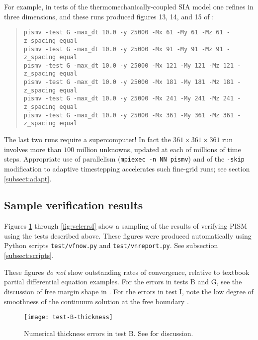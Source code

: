 For example, in tests of the thermomechanically-coupled SIA model one refines in three dimensions, and these runs produced figures 13, 14, and 15 of \cite{BBL}:
\begin{quote}\small
\begin{verbatim}
pismv -test G -max_dt 10.0 -y 25000 -Mx 61 -My 61 -Mz 61 -z_spacing equal
pismv -test G -max_dt 10.0 -y 25000 -Mx 91 -My 91 -Mz 91 -z_spacing equal
pismv -test G -max_dt 10.0 -y 25000 -Mx 121 -My 121 -Mz 121 -z_spacing equal
pismv -test G -max_dt 10.0 -y 25000 -Mx 181 -My 181 -Mz 181 -z_spacing equal
pismv -test G -max_dt 10.0 -y 25000 -Mx 241 -My 241 -Mz 241 -z_spacing equal
pismv -test G -max_dt 10.0 -y 25000 -Mx 361 -My 361 -Mz 361 -z_spacing equal
\end{verbatim}
\normalsize\end{quote}
The last two runs require a supercomputer!  In fact the $361\times 361\times 361$ run involves more than $100$ million unknowns, updated at each of millions of time steps. Appropriate use of parallelism (\texttt{mpiexec -n NN pismv}) and of the \texttt{-skip} modification to adaptive timestepping accelerates such fine-grid runs; see section \ref{subsect:adapt}.


\subsection{Sample verification results}  Figures \ref{fig:thickerrsB} through
\ref{fig:velerrsI} show a sampling of the results of verifying PISM using the
tests described above.  These
figures were produced automatically using Python scripts
\texttt{test/vfnow.py}  and \texttt{test/vnreport.py}.  See subsection \ref{subsect:scripts}.

These figures \emph{do not} show outstanding rates of convergence, relative to textbook partial differential equation examples.  For the errors in tests B and G, see the discussion of free margin shape in \cite{BLKCB}.  For the errors in test I, note the low degree of smoothness of the continuum solution at the free boundary \cite{SchoofStream}.  

\begin{figure}[ht]
\centering
\texttt{[image: test-B-thickness]}
\caption{Numerical thickness errors in test B. See \cite{BLKCB} for discussion.}
\label{fig:thickerrsB}
\end{figure}


